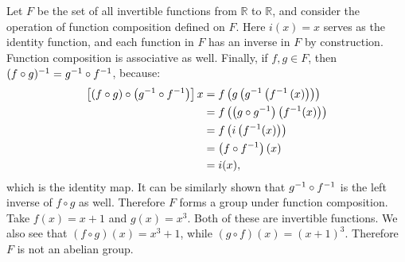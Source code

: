 \begin{example}
Let $F$ be the set of all invertible functions from $\mathbb{R}$ to $\mathbb{R}$, and consider the operation of function composition defined on $F$. Here $i(x) = x$ serves as the identity function, and each function in $F$ has an inverse in $F$ by construction. Function composition is associative as well. Finally, if $f, g \in F$, then $(f \circ g)^{-1} = g^{-1} \circ f^{-1}$, because: 
\begin{align*}
\left[(f \circ g) \circ \left(g^{-1} \circ f^{-1}\right)\right]x &= f\left(g\left(g^{-1}\left(f^{-1} \left(x\right)\right)\right)\right) \\
 &= f\left(\left(g \circ g^{-1}\right)\left(f^{-1}(x)\right)\right) \\
 &= f\left(i\left(f^{-1}(x)\right)\right) \\
 &= \left(f \circ f^{-1}\right)(x) \\
 &= i(x)\mathrm{,}
\end{align*}
which is the identity map. It can be similarly shown that $g^{-1} \circ f^{-1}$ is the left inverse of $f \circ g$ as well. Therefore $F$ forms a group under function composition. Take $f(x) = x+1$ and $g(x) = x^3$. Both of these are invertible functions. We also see that $(f \circ g)(x) = x^3 + 1$, while $(g \circ f)(x) = (x+1)^3$. Therefore $F$ is not an abelian group.
\end{example}



